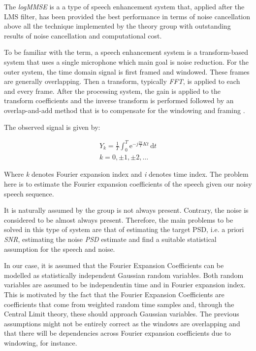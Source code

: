 \documentclass[11pt,a4paper,english]{book}  %
\theoremstyle{definition}  %
\theoremstyle{plain}  %
\theoremstyle{remark}  %
\begin{document}
The \textit{logMMSE} is a a type of speech enhancement system that, applied after the LMS filter, has been provided the best performance in terms of noise cancellation above all the technique implemented by the theory group with outstanding results of noise cancellation and computational cost.
	
	To be familiar with the term, a speech enhancement system is a transform-based system that uses a single microphone which main goal is noise reduction. For the outer system, the time domain signal is first framed and windowed.  These frames are generally overlapping. Then a transform, typically \textit{FFT}, is applied to each and every frame. After the processing system, the gain is applied to the transform coefficients and the inverse transform is performed followed by an overlap-and-add method that is to compensate for the windowing and framing \citep{speech}.

	
	The observed signal is given by:

	\begin{subequations}
	\label{eq:speech1}
	\begin{align}
	Y_{k}=\frac{1}{T} \int_0^T \mathrm{e}^{-j \frac{2\pi}{T} Kt}\,\mathrm{d}t\\
	k=0, \pm 1, \pm 2, \dots	
	\end{align}
	
	\end{subequations}
	
	
	Where \textit{k} denotes Fourier expansion index and \textit{i} denotes time index. The problem here is to estimate the Fourier expansion coefficients of the speech given our noisy speech sequence.

It is naturally assumed by the group is not always present. Contrary, the noise is considered to be almost always present. Therefore, the main problems to be solved in this type of system are that of estimating the target PSD, i.e. a priori \textit{SNR}, estimating the noise \textit{PSD} estimate and find a suitable statistical assumption for the speech and noise.


In our case, it is assumed that the Fourier Expansion Coefficients can be modelled as statistically independent Gaussian random variables. Both random variables are assumed to be independentin time and in Fourier expansion index. This is motivated by the fact that the Fourier Expansion Coefficients are coefficients that come from weighted random time samples and, through the Central Limit theory, these should approach Gaussian variables. The previous assumptions might not be entirely correct as the windows are overlapping and that there will be dependencies across Fourier expansion coefficients due to windowing, for instance.
\end{document}
